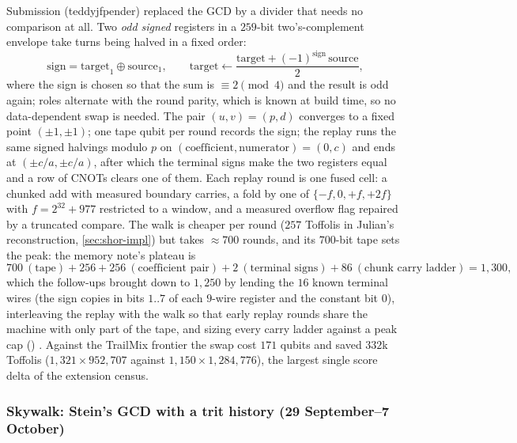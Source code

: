 Submission  (teddyjfpender) replaced the GCD by a divider that needs no comparison at all. Two \emph{odd signed} registers in a $259$-bit two's-complement envelope take turns being halved in a fixed order:
\begin{equation}\label{eq:pingpong}
\mathrm{sign}=\mathrm{target}_1\oplus\mathrm{source}_1,\qquad \mathrm{target}\gets\frac{\mathrm{target}+(-1)^{\mathrm{sign}}\,\mathrm{source}}{2},
\end{equation}
where the sign is chosen so that the sum is $\equiv2\pmod4$ and the result is odd again; roles alternate with the round parity, which is known at build time, so no data-dependent swap is needed. The pair $(u,v)=(p,d)$ converges to a fixed point $(\pm1,\pm1)$; one tape qubit per round records the sign; the replay runs the same signed halvings modulo $p$ on $(\mathrm{coefficient},\mathrm{numerator})=(0,c)$ and ends at $(\pm c/a,\pm c/a)$, after which the terminal signs make the two registers equal and a row of CNOTs clears one of them. Each replay round is one fused cell: a chunked add with measured boundary carries, a fold by one of $\{-f,0,+f,+2f\}$ with $f=2^{32}+977$ restricted to a window, and a measured overflow flag repaired by a truncated compare. The walk is cheaper per round ($257$ Toffolis in Julian's reconstruction, \cref{sec:shor-impl}) but takes $\approx700$ rounds, and its $700$-bit tape sets the peak: the memory note's plateau is
\[
700\ (\text{tape})+256+256\ (\text{coefficient pair})+2\ (\text{terminal signs})+86\ (\text{chunk carry ladder})=1{,}300 ,
\]
which the follow-ups brought down to $1{,}250$ by lending the $16$ known terminal wires (the sign copies in bits $1..7$ of each $9$-wire register and the constant bit $0$), interleaving the replay with the walk so that early replay rounds share the machine with only part of the tape, and sizing every carry ladder against a peak cap () \cite{ecdsafail-wiki}. Against the TrailMix frontier the swap cost $171$ qubits and saved $332$k Toffolis ($1{,}321\times952{,}707$ against $1{,}150\times1{,}284{,}776$), the largest single score delta of the extension census.

\subsubsection{Skywalk: Stein's GCD with a trit history (29 September--7 October)}\label{sec:skywalk}

